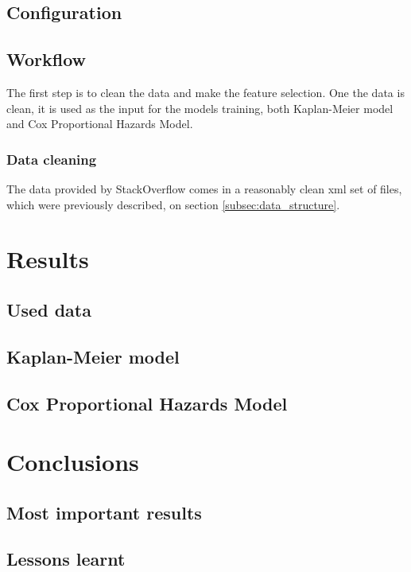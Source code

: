 \documentclass[11pt]{article} %
\begin{document}
  \subsection{Configuration}

  \subsection{Workflow}

    The first step is to clean the data and make the feature selection. One the data is clean, it is used as the input for the models training, both Kaplan-Meier model and Cox Proportional Hazards Model.

  \subsubsection{Data cleaning}
    The data provided by StackOverflow comes in a reasonably clean xml set of files, which were previously described, on section \ref{subsec:data_structure}.


\section{Results}
  \label{sec:results}

  \subsection{Used data}

  \subsection{Kaplan-Meier model}

  \subsection{Cox Proportional Hazards Model}

\section{Conclusions}
  \label{sec:conclusions}

  \subsection{Most important results}

  \subsection{Lessons learnt}
\end{document}
